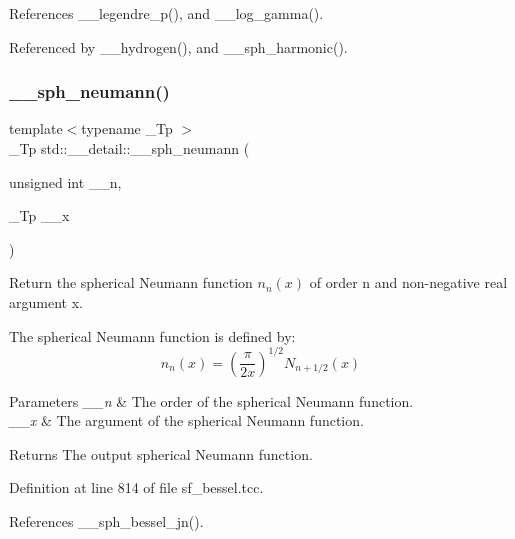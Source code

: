 References \+\_\+\+\_\+legendre\+\_\+p(), and \+\_\+\+\_\+log\+\_\+gamma().



Referenced by \+\_\+\+\_\+hydrogen(), and \+\_\+\+\_\+sph\+\_\+harmonic().

\mbox{\label{namespacestd_1_1____detail_a94ac68003333b86b157a3b1e6ce44830}} 
\subsubsection{\texorpdfstring{\+\_\+\+\_\+sph\+\_\+neumann()}{\_\_sph\_neumann()}\hspace{0.1cm}{\footnotesize\ttfamily [1/2]}}
{\footnotesize\ttfamily template$<$typename \+\_\+\+Tp $>$ \\
\+\_\+\+Tp std\+::\+\_\+\+\_\+detail\+::\+\_\+\+\_\+sph\+\_\+neumann (\begin{DoxyParamCaption}\item[{unsigned int}]{\+\_\+\+\_\+n,  }\item[{\+\_\+\+Tp}]{\+\_\+\+\_\+x }\end{DoxyParamCaption})}



Return the spherical Neumann function $ n_n(x) $ of order n and non-\/negative real argument {\ttfamily x}. 

The spherical Neumann function is defined by\+: \[ n_n(x) = \left(\frac{\pi}{2x} \right) ^{1/2} N_{n+1/2}(x) \]


\begin{DoxyParams}{Parameters}
{\em \+\_\+\+\_\+n} & The order of the spherical Neumann function. \\
\hline
{\em \+\_\+\+\_\+x} & The argument of the spherical Neumann function. \\
\hline
\end{DoxyParams}
\begin{DoxyReturn}{Returns}
The output spherical Neumann function. 
\end{DoxyReturn}


Definition at line 814 of file sf\+\_\+bessel.\+tcc.



References \+\_\+\+\_\+sph\+\_\+bessel\+\_\+jn().

